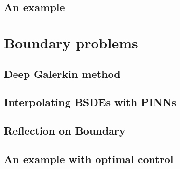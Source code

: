 \subsection{An example}
\section{Boundary problems}
\subsection{Deep Galerkin method}
\subsection{Interpolating BSDEs with PINNs}
\subsection{Reflection on Boundary}

\subsection{An example with optimal control}